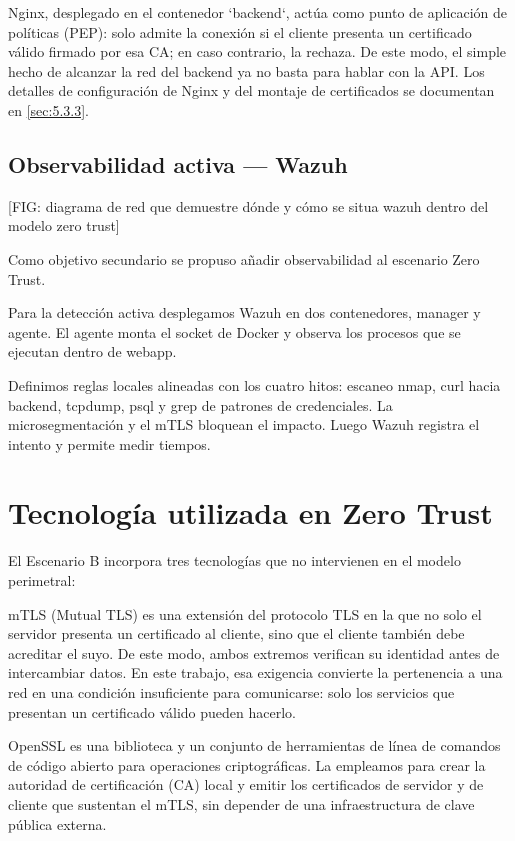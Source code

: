 \documentclass[11pt,spanish,listoffigures,listoftables]{tfgetsinf}
\begin{document}
        Nginx, desplegado en el contenedor `backend`, actúa como punto de aplicación de políticas (PEP): solo admite la conexión si el cliente presenta un certificado válido firmado por esa CA; en caso contrario, la rechaza. De este modo, el simple hecho de alcanzar la red del backend ya no basta para hablar con la API. Los detalles de configuración de Nginx y del montaje de certificados se documentan en \cref{sec:5.3.3}.
        
        \subsection{Observabilidad activa — Wazuh}
        [FIG: diagrama de red que demuestre dónde y cómo se situa wazuh dentro del modelo zero trust]
        
        Como objetivo secundario se propuso añadir observabilidad al escenario Zero Trust.
        
        Para la detección activa desplegamos Wazuh en dos contenedores, manager y agente. El agente monta el socket de Docker y observa los procesos que se ejecutan dentro de webapp.

        Definimos reglas locales alineadas con los cuatro hitos: escaneo nmap, curl hacia backend, tcpdump, psql y grep de patrones de credenciales. La microsegmentación y el mTLS bloquean el impacto. Luego Wazuh registra el intento y permite medir tiempos. 

    \section{Tecnología utilizada en Zero Trust}
    El Escenario B incorpora tres tecnologías que no intervienen en el modelo perimetral:

    mTLS (Mutual TLS) es una extensión del protocolo TLS en la que no solo el servidor presenta un certificado al cliente, sino que el cliente también debe acreditar el suyo. De este modo, ambos extremos verifican su identidad antes de intercambiar datos. En este trabajo, esa exigencia convierte la pertenencia a una red en una condición insuficiente para comunicarse: solo los servicios que presentan un certificado válido pueden hacerlo.

    OpenSSL es una biblioteca y un conjunto de herramientas de línea de comandos de código abierto para operaciones criptográficas. La empleamos para crear la autoridad de certificación (CA) local y emitir los certificados de servidor y de cliente que sustentan el mTLS, sin depender de una infraestructura de clave pública externa.
\end{document}
